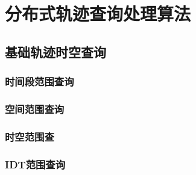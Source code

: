 \chapter{分布式轨迹查询处理算法}
\section{基础轨迹时空查询}
\subsection{时间段范围查询}
\subsection{空间范围查询}
\subsection{时空范围查}
\subsection{IDT范围查询}
